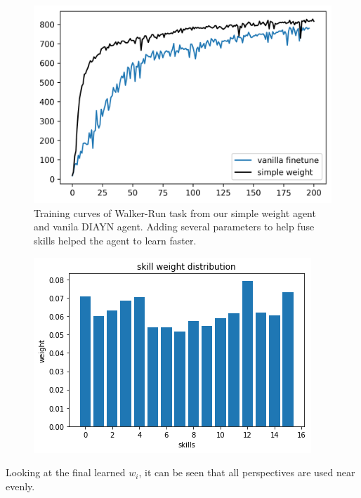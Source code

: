 \begin{figure}[ht]
  \vskip 0.2in
  \begin{center}
  \centerline{\includegraphics[width=\columnwidth]{Figures/walker_run_simple_weight.png}}
  \caption{Training curves of Walker-Run task from our simple weight agent and vanila DIAYN agent.
  Adding several parameters to help fuse skills helped the agent to learn faster.}
  \label{walker-run-simple-weight}
  \end{center}
  \vskip -0.2in
  \end{figure}


  \begin{figure}[ht]
    \vskip 0.2in
    \begin{center}
    \centerline{\includegraphics[width=\columnwidth]{Figures/skill_weight.png}}
    \caption{}
    \label{final_skill_weight}
    \end{center}
    \vskip -0.2in
    \end{figure}
Looking at the final learned ${w_i}$, it can be seen that all perspectives are used near evenly.


